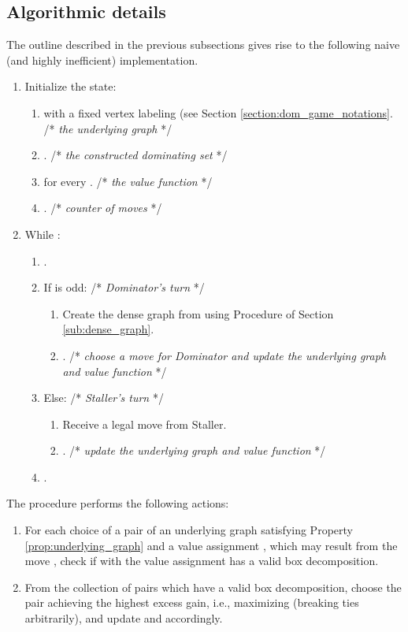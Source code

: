 \documentclass[11pt]{article}
\def\dnsitem{\vspace{-7pt}\item}
\def\dnssubitem{\vspace{-5pt}\item}
\theoremstyle{definition}
\begin{document}
\subsection{Algorithmic details}
\label{sub:algorithmic_details}
The outline described in the previous subsections gives rise to the following naive (and highly inefficient) implementation.

\smallskip
\par{}
\begin{enumerate}
	\dnsitem Initialize the state:
	\begin{enumerate}
		\dnsitem  with a fixed vertex labeling (see Section \ref{section:dom_game_notations}.
/*  \textit{the underlying graph} */
		\dnssubitem . /* \textit{the constructed dominating set} */
		\dnssubitem  for every . /* \textit{the value function} */
		\dnssubitem . /* \textit{counter of moves} */
	\end{enumerate}
	
	\dnsitem While :
	\begin{enumerate}
		\dnsitem .
		
		\dnssubitem If  is odd: /* \textit{Dominator's turn} */
		\begin{enumerate}
			\dnsitem Create the dense graph  from  using Procedure  of Section \ref{sub:dense_graph}.
			\dnsitem . /* \textit{choose a move for Dominator and update the underlying graph and value function} */ 
		\end{enumerate}
		
		\dnssubitem Else: /* \textit{Staller's turn} */
		\begin{enumerate}
			\dnsitem Receive a legal move  from Staller.
			\dnsitem . /* \textit{update the underlying graph and value function} */
		\end{enumerate}
		\dnssubitem .
	\end{enumerate}
\end{enumerate}

The procedure  performs the following actions:
\begin{enumerate}
	\dnsitem For each choice of a pair  of an underlying graph  satisfying Property \ref{prop:underlying_graph} and a value assignment , 
	which may result from the move ,
	check if  with the value assignment  has a valid box decomposition.
	\dnsitem From the collection of pairs  which have a valid box decomposition,
	choose the pair  achieving the highest excess gain, i.e., maximizing  (breaking ties arbitrarily),
	and update  and  accordingly.
\end{enumerate}
\end{document}
